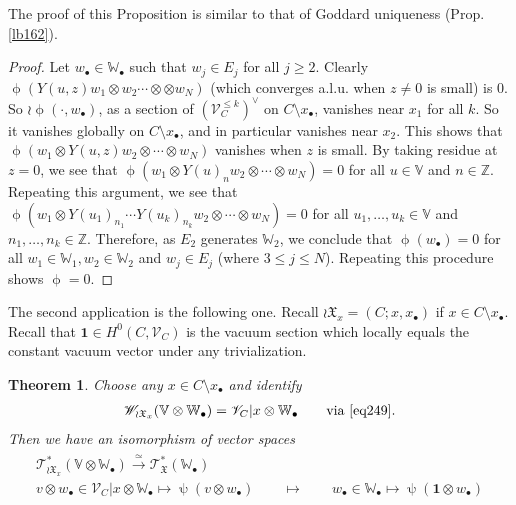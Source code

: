 \documentclass[12pt,a4paper,notitlepage]{article}
\theoremstyle{definition}
\theoremstyle{plain}
\newtheorem{thm}[df]{Theorem}
\newcommand{\fk}{\mathfrak}
\newcommand{\id}{\mathbf{1}}
\newcommand{\scr}{\mathscr}
\newcommand{\blt}{\bullet}
\newcommand{\Vbb}{\mathbb V}
\newcommand{\Wbb}{\mathbb W}
\newcommand{\Zbb}{\mathbb Z}
\numberwithin{equation}{section}
\begin{document}
The proof of this Proposition is similar to that of Goddard uniqueness (Prop. \ref{lb162}).

\begin{proof}
Let $w_\blt\in\Wbb_\blt$ such that $w_j\in E_j$ for all $j\geq 2$. Clearly $\upphi(Y(u,z)w_1\otimes w_2\cdots\otimes \otimes w_N)$ (which converges a.l.u. when $z\neq 0$ is small) is $0$. So $\wr\upphi(\cdot,w_\blt)$, as a section of $(\scr V_C^{\leq k})^\vee$ on $C\setminus x_\blt$, vanishes near $x_1$ for all $k$. So it vanishes globally on $C\setminus x_\blt$, and  in particular vanishes near $x_2$. This shows that $\upphi(w_1\otimes Y(u,z)w_2\otimes \cdots\otimes w_N)$ vanishes when $z$ is small. By taking residue at $z=0$, we see that $\upphi(w_1\otimes Y(u)_nw_2\otimes\cdots\otimes w_N)=0$ for all $u\in\Vbb$ and $n\in\Zbb$. Repeating this argument, we see that $\upphi(w_1\otimes Y(u_1)_{n_1}\cdots Y(u_k)_{n_k}w_2\otimes\cdots\otimes w_N)=0$ for all $u_1,\dots,u_k\in\Vbb$ and $n_1,\dots,n_k\in\Zbb$. Therefore, as $E_2$ generates $\Wbb_2$, we conclude that $\upphi(w_\blt)=0$ for all $w_1\in\Wbb_1,w_2\in\Wbb_2$ and $w_j\in E_j$ (where $3\leq j\leq N$). Repeating this procedure shows $\upphi=0$.
\end{proof}




The second application is the following one. Recall $\wr\fk X_x=(C;x,x_\blt)$ if $x\in C\setminus x_\blt$. Recall that $\id\in H^0(C,\scr V_C)$ is the vacuum section which locally equals the constant vacuum vector under any trivialization. 





\begin{thm}\label{lb166}
Choose any $x\in C\setminus x_\blt$ and identify 
\begin{gather*}
\scr W_{\wr\fk X_x}(\Vbb\otimes \Wbb_\blt)=\scr V_C|x\otimes\Wbb_\blt\qquad\text{via }\eqref{eq249}.
\end{gather*}
Then we have an isomorphism of vector spaces
\begin{gather}\label{eq251}
\begin{gathered}
\scr T_{\wr\fk X_x}^*(\Vbb\otimes\Wbb_\blt)\xrightarrow{\simeq}\scr T_{\fk X}^*(\Wbb_\blt)\\
\boxed{v\otimes w_\blt\in\scr V_C|x\otimes\Wbb_\blt\mapsto\uppsi(v\otimes w_\blt)}\qquad\mapsto \qquad \boxed{w_\blt\in \Wbb_\blt\mapsto \uppsi(\id\otimes w_\blt)}  
\end{gathered}
\end{gather}
\end{thm}
\end{document}
